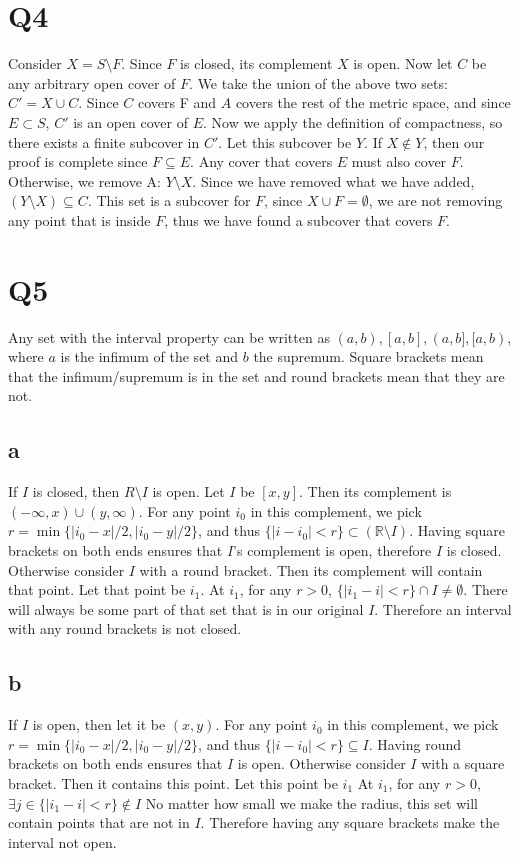 \documentclass[12pt]{article}
\newcommand{\R}{\mathbb{R}}
\begin{document}
\section{Q4}
Consider $X = S \setminus F$. Since $F$ is closed, its complement $X$ is open. Now let $C$ be any arbitrary open cover of $F$. We take the union of the above two sets: $C' = X \cup C$. Since $C$ covers F and $A$ covers the rest of the metric space, and since $E \subset S$, $C'$ is an open cover of $E$.
\newline
Now we apply the definition of compactness, so there exists a finite subcover in $C'$. Let this subcover be $Y$. If $X \not\in Y$, then our proof is complete since $F \subseteq E$. Any cover that covers $E$ must also cover $F$.
\newline
Otherwise, we remove A: $Y \setminus X$. Since we have removed what we have added, $(Y \setminus X) \subseteq C$. This set is a subcover for $F$, since $X \cup F = \emptyset$, we are not removing any point that is inside $F$, thus we have found a subcover that covers $F$.
\newpage


\section{Q5}
Any set with the interval property can be written as $(a,b), [a,b], (a,b], [a,b)$, where $a$ is the infimum of the set and $b$ the supremum. Square brackets mean that the infimum/supremum is in the set and round brackets mean that they are not.

\subsection{a}
If $I$ is closed, then $R \setminus I$ is open. Let $I$ be $[x,y]$. Then its complement is $(-\infty, x) \cup (y, \infty)$. For any point $i_0$ in this complement, we pick $r = \min\{|i_0-x|/2, |i_0-y|/2\}$, and thus $\{|i-i_0|<r\} \subset (\R \setminus I)$. Having square brackets on both ends ensures that $I$'s complement is open, therefore $I$ is closed.
\newline
Otherwise consider $I$ with a round bracket. Then its complement will contain that point. Let that point be $i_1$. At $i_1$, for any $r>0$, $\{|i_1-i|<r\} \cap I \not = \emptyset$. There will always be some part of that set that is in our original $I$. Therefore an interval with any round brackets is not closed.

\subsection{b}
If $I$ is open, then let it be $(x,y)$. For any point $i_0$ in this complement, we pick $r = \min\{|i_0-x|/2, |i_0-y|/2\}$, and thus $\{|i-i_0|<r\} \subseteq I$. Having round brackets on both ends ensures that $I$ is open.
\newline
Otherwise consider $I$ with a square bracket. Then it contains this point. Let this point be $i_1$ At $i_1$, for any $r>0$, $\exists j \in \{|i_1-i|<r\} \not \in I$
\newline
No matter how small we make the radius, this set will contain points that are not in $I$. Therefore having any square brackets make the interval not open.
\newpage
\end{document}

